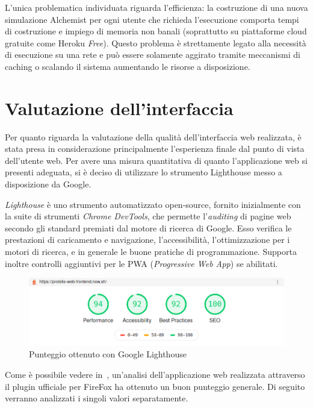     L'unica problematica individuata riguarda l'efficienza:
    la costruzione di una nuova simulazione Alchemist per ogni utente che richieda l'esecuzione comporta tempi di costruzione e impiego di memoria non banali (soprattutto su piattaforme cloud gratuite come Heroku \emph{Free}).
    Questo problema è strettamente legato alla necessità di esecuzione su una rete e può essere solamente aggirato tramite meccanismi di caching o scalando il sistema aumentando le risorse a disposizione.

  \section{Valutazione dell'interfaccia}
    Per quanto riguarda la valutazione della qualità dell'interfaccia web realizzata, è stata presa in considerazione principalmente l'esperienza finale dal punto di vista dell'utente web.
    Per avere una misura quantitativa di quanto l'applicazione web si presenti adeguata, si è deciso di utilizzare lo strumento Lighthouse messo a disposizione da Google.

    \emph{Lighthouse} è uno strumento automatizzato open-source, fornito inizialmente con la suite di strumenti \emph{Chrome DevTools}, che permette l'\emph{auditing} di pagine web secondo gli standard premiati dal motore di ricerca di Google.
    Esso verifica le prestazioni di caricamento e navigazione, l'accessibilità, l'ottimizzazione per i motori di ricerca, e in generale le buone pratiche di programmazione.
    Supporta inoltre controlli aggiuntivi per le PWA (\emph{\emph{P}rogressive \emph{W}eb \emph{A}pp}) se abilitati.

    \begin{figure}[htbp]
      \centering
      \includegraphics[width=\textwidth]{res/tests/Screenshot_2020-03-04 Lighthouse Report Viewer.png}%
      \caption{Punteggio ottenuto con Google Lighthouse}%
      \label{fig:lighthouse}
    \end{figure}

    Come è possibile vedere in~, un'analisi dell'applicazione web realizzata attraverso il plugin ufficiale per FireFox ha ottenuto un buon punteggio generale.
    Di seguito verranno analizzati i singoli valori separatamente.


